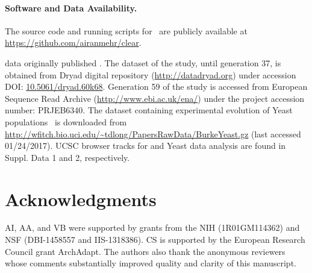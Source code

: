 \paragraph{Software and Data Availability.}

The source code and running scripts for \comale\ are publicly available at 
\url{https://github.com/airanmehr/clear}. 

\dmel data originally published 
\cite{orozco2012adaptation,franssen2015patterns}. The dataset of the 
\dmel study, until generation 37, is obtained from Dryad 
digital repository (\url{http://datadryad.org}) under 
accession DOI: 
\href{http://datadryad.org/resource/doi:10.5061/dryad.60k68}{10.5061/dryad.60k68}.
Generation 59 of the \dmel study is accessed from
  European Sequence Read Archive 
  (\href{http://www.ebi.ac.uk/ena/}{http://www.ebi.ac.uk/ena/})  under 
  the 
  project accession number: PRJEB6340.
The dataset containing experimental evolution of Yeast 
populations~\cite{burke2014standing} is 
downloaded from 
\url{http://wfitch.bio.uci.edu/~tdlong/PapersRawData/BurkeYeast.gz}
(last accessed 01/24/2017). 
UCSC browser tracks for \dmel and Yeast data analysis are found in Suppl. Data 
1 and 2, respectively.
\section*{Acknowledgments}
AI, AA, and VB were supported by grants from the NIH (1R01GM114362) and
NSF (DBI-1458557 and IIS-1318386). CS is supported by the European Research 
Council grant ArchAdapt.
The authors also thank the anonymous reviewers whose comments 
substantially improved quality and clarity of this manuscript.